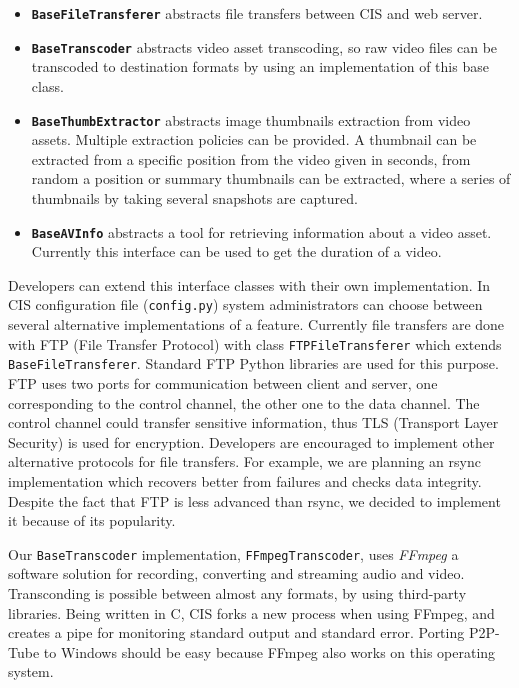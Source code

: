 \begin{itemize}
 \item \textbf{\texttt{BaseFileTransferer}} abstracts file transfers between CIS and web server.
 \item \textbf{\texttt{BaseTranscoder}} abstracts video asset transcoding, so raw video files can be transcoded to destination formats by using an implementation of this base class.
 \item \textbf{\texttt{BaseThumbExtractor}} abstracts image thumbnails extraction from video assets. Multiple extraction policies can be provided. A thumbnail can be extracted from a specific position from the video given in seconds, from random a position or summary thumbnails can be extracted, where a series of thumbnails by taking several snapshots are captured.
 \item \textbf{\texttt{BaseAVInfo}} abstracts a tool for retrieving information about a video asset. Currently this interface can be used to get the duration of a video.
\end{itemize}

Developers can extend this interface classes with their own implementation. In CIS configuration file (\texttt{config.py}) system administrators can choose between several alternative implementations of a feature. Currently file transfers are done with FTP (File Transfer Protocol) \cite{ftp} with class \texttt{FTPFileTransferer} which extends \texttt{BaseFileTransferer}. Standard FTP Python libraries are used for this purpose. FTP uses two ports for communication between client and server, one corresponding to the control channel, the other one to the data channel. The control channel could transfer sensitive information, thus TLS (Transport Layer Security) \cite{tls} is used for encryption. Developers are encouraged to implement other alternative protocols for file transfers. For example, we are planning an rsync \cite{rsync} implementation which recovers better from failures and checks data integrity. Despite the fact that FTP is less advanced than rsync, we decided to implement it because of its popularity.

Our \texttt{BaseTranscoder} implementation, \texttt{FFmpegTranscoder}, uses \textit{FFmpeg} \cite{ffmpeg} a software solution for recording, converting and streaming audio and video. Transconding is possible between almost any formats, by using third-party libraries. Being written in C, CIS forks a new process when using FFmpeg, and creates a pipe for monitoring standard output and standard error. Porting P2P-Tube to Windows should be easy because FFmpeg also works on this operating system.

